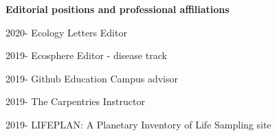 \documentclass[]{CV}
\begin{document}

\textbf{Editorial positions and professional affiliations}

\begin{entrylist}
 
 \entry
	 {2020-}
	 {Ecology Letters}
	 {Editor}
	 
 \entry
	 {2019-}
	 {Ecosphere}
	 {Editor - disease track}

 \entry
	 {2019-}
	 {Github Education}
	 {Campus advisor}

 \entry
	 {2019-}
	 {The Carpentries}
	 {Instructor}

 \entry
	 {2019-}
	 {LIFEPLAN: A Planetary Inventory of Life}
	 {Sampling site}

\end{entrylist}
\end{document}
